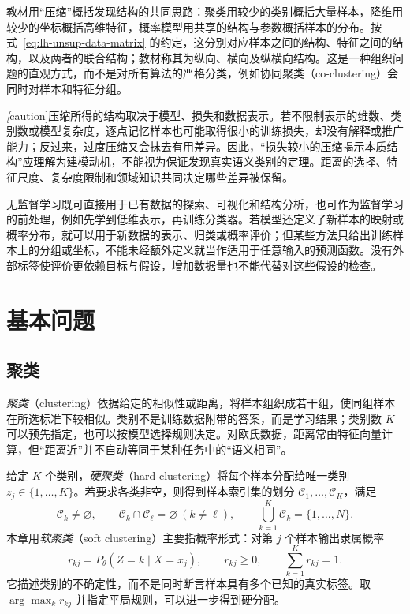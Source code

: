 教材用“压缩”概括发现结构的共同思路：聚类用较少的类别概括大量样本，降维用较少的坐标概括高维特征，概率模型用共享的结构与参数概括样本的分布。按式~\eqref{eq:lh-unsup-data-matrix} 的约定，这分别对应样本之间的结构、特征之间的结构，以及两者的联合结构；教材称其为纵向、横向及纵横向结构。这是一种组织问题的直观方式，而不是对所有算法的严格分类，例如协同聚类（co-clustering）会同时对样本和特征分组。

\emph[caution]{压缩所得的结构取决于模型、损失和数据表示。}若不限制表示的维数、类别数或模型复杂度，逐点记忆样本也可能取得很小的训练损失，却没有解释或推广能力；反过来，过度压缩又会抹去有用差异。因此，“损失较小的压缩揭示本质结构”应理解为建模动机，不能视为保证发现真实语义类别的定理。距离的选择、特征尺度、复杂度限制和领域知识共同决定哪些差异被保留。

无监督学习既可直接用于已有数据的探索、可视化和结构分析，也可作为监督学习的前处理，例如先学到低维表示，再训练分类器。若模型还定义了新样本的映射或概率分布，就可以用于新数据的表示、归类或概率评价；但某些方法只给出训练样本上的分组或坐标，不能未经额外定义就当作适用于任意输入的预测函数。没有外部标签使评价更依赖目标与假设，增加数据量也不能代替对这些假设的检查。

\section{基本问题}
\label{sec:lh-unsup-problems}

\subsection{聚类}
\label{subsec:lh-unsup-clustering}

\emph{聚类}（clustering）依据给定的相似性或距离，将样本组织成若干组，使同组样本在所选标准下较相似。类别不是训练数据附带的答案，而是学习结果；类别数 $K$ 可以预先指定，也可以按模型选择规则决定。对欧氏数据，距离常由特征向量计算，但“距离近”并不自动等同于某种任务中的“语义相同”。

\begin{definition}[硬聚类与概率软聚类]
\label{def:lh-unsup-hard-soft}
给定 $K$ 个类别，\emph{硬聚类}（hard clustering）将每个样本分配给唯一类别 $z_j\in\{1,\ldots,K\}$。若要求各类非空，则得到样本索引集的划分 $\mathcal C_1,\ldots,\mathcal C_K$，满足
\[
\mathcal C_k\ne\varnothing,\qquad
\mathcal C_k\cap\mathcal C_\ell=\varnothing\ (k\ne\ell),\qquad
\bigcup_{k=1}^K\mathcal C_k=\{1,\ldots,N\}.
\]
本章用\emph{软聚类}（soft clustering）主要指概率形式：对第 $j$ 个样本输出隶属概率
\begin{equation}
r_{kj}=P_\theta(Z=k\mid X=x_j),\qquad
r_{kj}\geq0,\qquad \sum_{k=1}^Kr_{kj}=1.
\label{eq:lh-unsup-responsibility}
\end{equation}
它描述类别的不确定性，而不是同时断言样本具有多个已知的真实标签。取 $\arg\max_k r_{kj}$ 并指定平局规则，可以进一步得到硬分配。
\end{definition}

